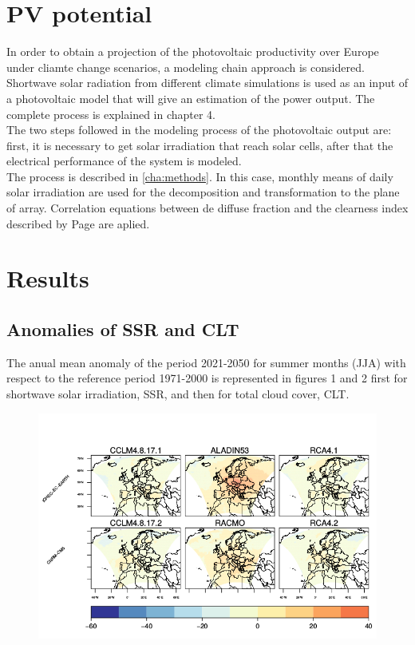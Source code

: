 \section{PV potential}

In order to obtain a projection of the photovoltaic productivity over Europe under cliamte change scenarios, a modeling chain approach is considered. Shortwave solar radiation from different climate simulations is used as an input of a photovoltaic model that will give an estimation of the power output. The complete process is explained in chapter 4.\\

The two steps followed in the modeling process of the photovoltaic output are: first, it is necessary to get solar irradiation that reach solar cells, after that the electrical performance of the system is modeled.\\

The process is described in \ref{cha:methods}. In this case, monthly means of daily solar irradiation are used for the decomposition and transformation to the plane of array. Correlation equations between de diffuse fraction and the clearness index described by Page are aplied.   

\section{Results}

\subsection{Anomalies of SSR and CLT}

The anual mean anomaly of the period 2021-2050 for summer months (JJA) with respect to the reference period 1971-2000 is represented in figures 1 and 2 first for shortwave solar irradiation, SSR, and then for total cloud cover, CLT.\\

\begin{figure}[h!]
\centering\includegraphics[width=1\textwidth]{figs/capitulo7/ANOMALIAS_JJA_SSR_2050-2021.png}
\caption{}
\label{}
\end{figure}

